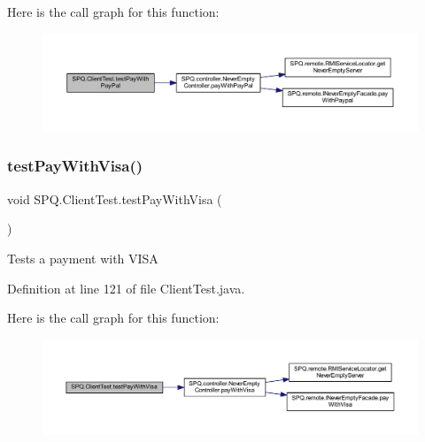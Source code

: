 Here is the call graph for this function\+:\nopagebreak
\begin{figure}[H]
\begin{center}
\leavevmode
\includegraphics[width=350pt]{class_s_p_q_1_1_client_test_afe92931ed84ed471c853004681be4072_cgraph}
\end{center}
\end{figure}
\mbox{\label{class_s_p_q_1_1_client_test_ae6f432ec2c9b37a231883ad94ffb624d}} 
\subsubsection{\texorpdfstring{test\+Pay\+With\+Visa()}{testPayWithVisa()}}
{\footnotesize\ttfamily void S\+P\+Q.\+Client\+Test.\+test\+Pay\+With\+Visa (\begin{DoxyParamCaption}{ }\end{DoxyParamCaption})}

Tests a payment with V\+I\+SA 

Definition at line 121 of file Client\+Test.\+java.

Here is the call graph for this function\+:\nopagebreak
\begin{figure}[H]
\begin{center}
\leavevmode
\includegraphics[width=350pt]{class_s_p_q_1_1_client_test_ae6f432ec2c9b37a231883ad94ffb624d_cgraph}
\end{center}
\end{figure}
\mbox{\label{class_s_p_q_1_1_client_test_ae74ec6f1a9672b8dbffeaf89abe44bbd}} 

